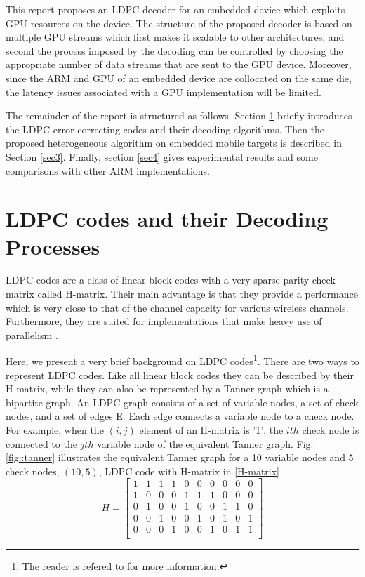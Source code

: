 \documentclass[10pt,a4paper]{article}
\begin{document}
This report proposes an LDPC decoder for an embedded device which exploits GPU resources on the device. The structure of the proposed decoder is based on multiple GPU streams which first makes it scalable to other architectures, and second the process imposed by the decoding can be controlled by choosing the appropriate number of data streams that are sent to the GPU device. Moreover, since the ARM and GPU of an embedded device are collocated on the same die, the latency issues associated with a GPU implementation will be limited.

The remainder of the report is structured as follows. Section \ref{sec2} briefly introduces the LDPC error correcting codes and their decoding algorithms. Then the proposed heterogeneous algorithm on embedded mobile targets is described in Section \ref{sec3}. Finally, section \ref{sec4} gives experimental results and some comparisons with other ARM implementations.

\section{LDPC codes and their Decoding Processes}\label{sec2}

LDPC codes are a class of linear block codes with a very sparse parity check matrix called H-matrix. Their main advantage is that they provide a performance which is very close to that of the channel capacity for various wireless channels. Furthermore, they are suited for implementations that make heavy use of parallelism \cite{art_castello}.

Here, we present a very brief background on LDPC codes\footnote{The reader is refered to \cite{art_castello} for more information.}. There are two ways to represent LDPC codes. Like all linear block codes they can be described by their H-matrix, while they can also be represented by a Tanner graph which is a bipartite graph. An LDPC graph consists of a set of variable nodes, a set of check nodes, and a set of edges E. Each edge connects a variable node to a check node. For example, when the $(i,j)$ element of an H-matrix is '1', the $ith$ check node is connected to the $jth$ variable node of the equivalent Tanner graph. Fig.\ref{fig::tanner} illustrates the equivalent Tanner graph for a 10 variable nodes and 5 check nodes, $(10,5)$, LDPC code with H-matrix in \eqref{H-matrix} \cite{art_castello}.
\noindent
\begin{equation}\label{H-matrix}
H=
  \begin{bmatrix}
    1 & 1 & 1 & 1 & 0 &0 &0 &0 &0 &0 \\
    1 & 0 & 0 & 0 & 1 &1 &1 &0 &0 &0 \\
    0 & 1 & 0 & 0 & 1 &0 &0 &1 &1 &0 \\
    0 & 0 & 1 & 0 & 0 &1 &0 &1 &0 &1 \\
    0 & 0 & 0 & 1 & 0 &0 &1 &0 &1 &1 \\
  \end{bmatrix}
\end{equation}
\end{document}
